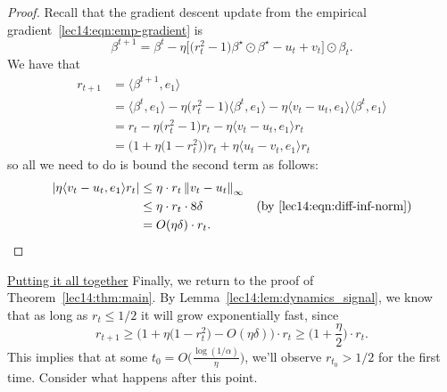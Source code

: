 \begin{proof}
    Recall that the gradient descent update from the empirical gradient~\eqref{lec14:eqn:emp-gradient} is
    \begin{equation}
        \beta^{t+1} = \beta^t - \eta \big[\big(r_{t}^{2} -1\big) \beta^\star \odot \beta^\star - u_{t} + v_{t}\big] \odot \beta_{t}.
    \end{equation} 
    We have that
    \begin{align}
        r_{t+1} &= \big\langle \beta^{t+1}, e_1\big\rangle \\
        &= \big\langle \beta^t, e_1\big\rangle - \eta \big(r_{t}^{2} -1\big)\big\langle \beta^t, e_1\big\rangle - \eta \big\langle v_t-u_t, e_1\big\rangle \big\langle \beta^t, e_1 \big\rangle \\
        &= r_t - \eta \big(r_{t}^{2} -1\big) r_t - \eta \big\langle v_t-u_t, e_1\big\rangle r_t \\
        &= \Big(1 + \eta\big( 1 - r_t^2 \big) \Big) r_t + \eta \big\langle u_t-v_t, e_1\big\rangle r_t
    \end{align}
    so all we need to do is bound the second term as follows:
    \begin{align}
        |\eta \langle v_t - u_t, e_1\rangle r_t| &\leq \eta \cdot r_t \left\|v_t-u_t\right\|_\infty \\
        &\leq \eta \cdot r_t \cdot 8\delta &(\text{by \eqref{lec14:eqn:diff-inf-norm}}) \\
        &= O(\eta\delta) \cdot r_t.
    \end{align}
\end{proof}

\underline{Putting it all together}
Finally, we return to the proof of Theorem~\ref{lec14:thm:main}. By Lemma~\ref{lec14:lem:dynamics_signal}, we know that as long as $r_t \leq 1/2$ it will grow exponentially fast, since
\begin{equation}
    r_{t+1} \geq \Big(1 + \eta\big(1-r_t^2\big) - O(\eta\delta) \Big) \cdot r_t \geq \bigg(1 + \frac{\eta}{2}\bigg)\cdot r_t.
\end{equation} 
This implies that at some $t_0 = O\Big(\frac{\log (1/\alpha)}{\eta}\Big)$, we'll observe $r_{t_0} > 1/2$ for the first time. Consider what happens after this point.

